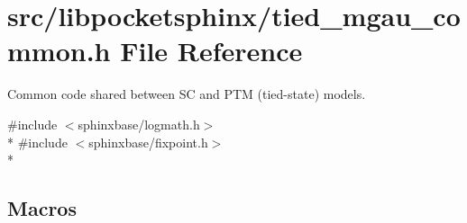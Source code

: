 \section{src/libpocketsphinx/tied\+\_\+mgau\+\_\+common.h File Reference}
\label{tied__mgau__common_8h}


Common code shared between S\+C and P\+T\+M (tied-\/state) models.  


{\ttfamily \#include $<$sphinxbase/logmath.\+h$>$}\\*
{\ttfamily \#include $<$sphinxbase/fixpoint.\+h$>$}\\*
\subsection*{Macros}
